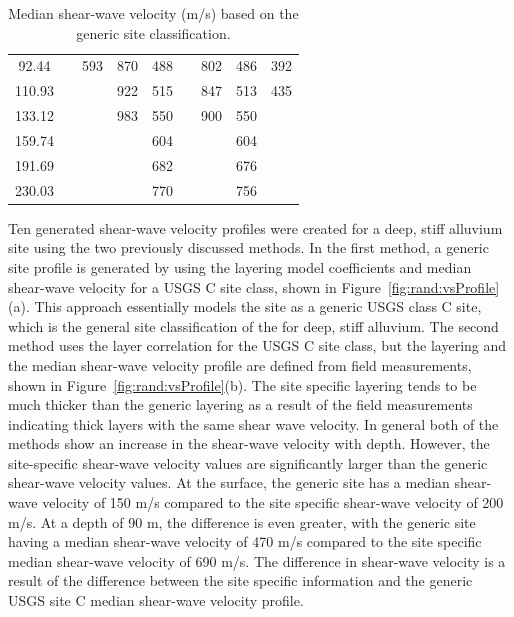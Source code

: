 \documentclass[11pt]{report}
\begin{document}
\begin{table}[tbp]
\begin{tabular}{ccc|cccccc}
	92.44 &      & 593 & 870 & 488 &      & 802 & 486 & 392 \\
	110.93 &      &     & 922 & 515 &      & 847 & 513 & 435 \\
	133.12 &      &     & 983 & 550 &      & 900 & 550 &     \\
	159.74 &      &     &     & 604 &      &     & 604 &     \\
	191.69 &      &     &     & 682 &      &     & 676 &     \\
	230.03 &      &     &     & 770 &      &     & 756 &     \\
	\hline\hline
  \end{tabular}
  \caption{Median shear-wave velocity (m/s) based on the generic site classification.}
  \label{tab:rand:velocity}
\end{table}


Ten generated shear-wave velocity profiles were created for a deep, stiff alluvium site using
the two previously discussed methods.  In the first method, a generic site profile is generated by
using the layering model coefficients and median shear-wave velocity for a USGS C site class, shown
in Figure~\ref{fig:rand:vsProfile}(a).  This approach essentially models the site as a generic USGS
class C site, which is the general site classification of the for deep, stiff alluvium.  The second
method uses the layer correlation for the USGS C site class, but the layering and the median
shear-wave velocity profile are defined from field measurements, shown in
Figure~\ref{fig:rand:vsProfile}(b).  The site specific layering tends to be much thicker than the
generic layering as a result of the field measurements indicating thick layers with the same shear
wave velocity.  In general both of the methods show an increase in the shear-wave velocity with
depth.  However, the site-specific shear-wave velocity values are significantly larger than the
generic shear-wave velocity values.  At the surface, the generic site has a median shear-wave
velocity of 150 m/s compared to the site specific shear-wave velocity of 200 m/s. At a depth of 90
m, the difference is even greater, with the generic site having a median shear-wave velocity of 470
m/s compared to the site specific median shear-wave velocity of 690 m/s.  The difference in
shear-wave velocity is a result of the difference between the site specific information and the
generic USGS site C median shear-wave velocity profile.
\end{document}
